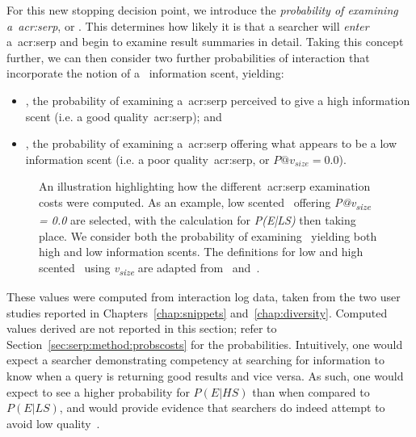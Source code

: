  For this new stopping decision point, we introduce the \emph{probability of examining a~\gls{acr:serp}}, or . This determines how likely it is that a searcher will \emph{enter} a~\gls{acr:serp} and begin to examine result summaries in detail. Taking this concept further, we can then consider two further probabilities of interaction that incorporate the notion of a~ information scent, yielding:

\begin{itemize}
    \item{, the probability of examining a~\gls{acr:serp} perceived to give a high information scent (i.e. a good quality~\gls{acr:serp}); and}
    \item{, the probability of examining a~\gls{acr:serp} offering what appears to be a low information scent (i.e. a poor quality~\gls{acr:serp}, or $P@v_{size}=0.0$).}
\end{itemize}

\begin{figure}[t!]
    \centering
    \caption[Computing~\gls{acr:serp} examination probabilities]{An illustration highlighting how the different~\gls{acr:serp} examination costs were computed. As an example, low scented~ offering \emph{P@v\textsubscript{size} = 0.0} are selected, with the calculation for \emph{P(E|LS)} then taking place. We consider both the probability of examining~ yielding both high and low information scents. The definitions for low and high scented~ using \emph{v\textsubscript{size}} are adapted from~\cite{wu2014information_scent} and~\cite{hassan2013serp_abandonment}.}
    \label{fig:serp_probabilities}
\end{figure}

These values were computed from interaction log data, taken from the two user studies reported in Chapters~\ref{chap:snippets} and~\ref{chap:diversity}. Computed values derived are not reported in this section; refer to Section~\ref{sec:serp:method:probscosts} for the probabilities. Intuitively, one would expect a searcher demonstrating competency at searching for information to know when a query is returning good results and vice versa. As such, one would expect to see a higher probability for $P(E|HS)$ than when compared to $P(E|LS)$, and would provide evidence that searchers do indeed attempt to avoid low quality~.

